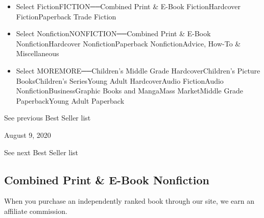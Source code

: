 \begin{itemize}
\tightlist
\item
  Select FictionFICTION──Combined Print \& E-Book FictionHardcover
  FictionPaperback Trade Fiction
\item
  Select NonfictionNONFICTION──Combined Print \& E-Book
  NonfictionHardcover NonfictionPaperback NonfictionAdvice, How-To \&
  Miscellaneous
\item
  Select MOREMORE──Children's Middle Grade HardcoverChildren's Picture
  BooksChildren's SeriesYoung Adult HardcoverAudio FictionAudio
  NonfictionBusinessGraphic Books and MangaMass MarketMiddle Grade
  PaperbackYoung Adult Paperback
\end{itemize}

\href{/books/best-sellers/2020/08/02/combined-print-and-e-book-nonfiction/}{}

See previous Best Seller list

August 9, 2020

See next Best Seller list

\hypertarget{combined-print--e-book-nonfiction}{%
\subsection{Combined Print \& E-Book
Nonfiction}\label{combined-print--e-book-nonfiction}}

When you purchase an independently ranked book through our site, we earn
an affiliate commission.

